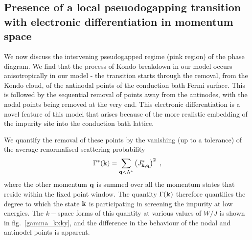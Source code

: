\documentclass[reprint,hidelinks,onecolumn]{revtex4-2}
\begin{document}
\subsection{Presence of a local pseuodogapping transition with electronic differentiation in momentum space}
We now discuss the intervening pseudogapped regime (pink region) of the phase diagram. We find that the process of Kondo breakdown in our model occurs anisotropically in our model - the transition starts through the removal, from the Kondo cloud, of the antinodal points of the conduction bath Fermi surface. This is followed by the sequential removal of points away from the antinodes, with the nodal points being removed at the very end. This electronic differentiation is a novel feature of this model that arises because of the more realistic embedding of the impurity site into the conduction bath lattice.

We quantify the removal of these points by the vanishing (up to a tolerance) of the average renormalised scattering probability 
\begin{equation}\begin{aligned}
	\Gamma^*({\bf k}) = \sum_{{\bf q} < \Lambda^*} \left(J^*_{{\bf k}, {\bf q}}\right)^2~,
\end{aligned}\end{equation}
where the other momentum \({\bf q}\) is summed over all the momentum states that reside within the fixed point window. The quantity \(\Gamma({\bf k})\) therefore quantifies the degree to which the state \({\bf k}\) is participating in screening the impurity at low energies. The \(k-\)space forms of this quantity at various values of \(W/J\) is shown in fig.~\ref{gamma_kxky}, and the difference in the behaviour of the nodal and antinodel points is apparent. 
\end{document}
